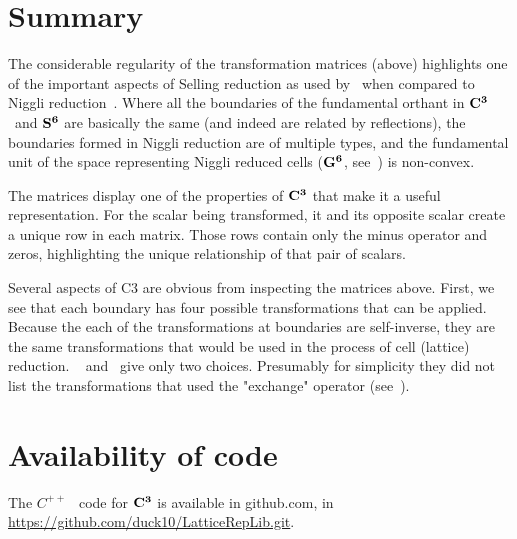 \documentclass[preprint]{iucr}              %
\numberwithin{equation}{section}
\newcommand{\SVI}[0]{$\bf{S^{6}}$}
\newcommand{\GVI}[0]{$\bf{G^{6}}$}
\newcommand{\CIII}[0]{$\bf{C^{3}}$}
\begin{document}
	
	
	
	
	
	
	\section{Summary}
	
	The considerable regularity 
	of the transformation matrices (above) highlights one
	of the important aspects of Selling reduction 
	as used by~
	when compared to Niggli reduction~\cite{Niggli1928}. 
	Where all the 	boundaries of the fundamental orthant 
	in \CIII ~and \SVI{} are basically the same 
	(and indeed are related by reflections), 
	the boundaries formed in Niggli reduction are of multiple types, 
	and the fundamental unit of the space representing 
	Niggli reduced cells (\GVI{}, see~) is non-convex.
	
	The matrices display one of the properties of \CIII{} 
	that make it a useful representation. 
	For the scalar being transformed, it and its 
	opposite scalar create a unique row in each matrix. 
	Those rows contain
	only the minus operator and zeros, 
	highlighting the unique relationship of that pair of scalars.
	
	Several aspects of C3 are obvious from inspecting the matrices above. 
	First, we see that each boundary has four possible 
	transformations that can be applied. 
	Because the each of the transformations at boundaries are self-inverse, 
	they are the same transformations that would 
	be used in the process of cell (lattice) reduction. 
	~ and~ give 
	only two choices. Presumably for simplicity they did not list
	the transformations that used the "exchange" operator 
	(see~\cite{andrews2019b}).
	
	
	
	
	
	\section{Availability of code}
	
	The $C^{++}$ ~code for \CIII{} is available in github.com, in
	\url{https://github.com/duck10/LatticeRepLib.git}.
	
	
	
	
\end{document}

